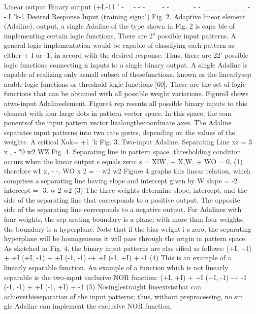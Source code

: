 \documentclass[11pt,a4paper,twocolumn]{article}
\begin{document}
Linear 
output 
Binary 
output 
(+L-11 
' - \_ - - - \_ \_ - - \_ \_ \_ - - \_ \_  
\_ \_ \_ \_ - - I  
'k-1
Desired Response Input 
(training signal) 
Fig. 2. Adaptive linear element (Adaline). 
output, a single Adaline of the type shown in Fig. 2 is capa
ble of implementing certain logic functions. There are 2" 
possible input patterns. A general logic implementation 
would be capable of classifying each pattern as either + I  
or -1, in accord with the desired response. Thus, there are 
22' possible logic functions connecting n inputs to a single 
binary output. A single Adaline is capable of realizing only 
asmall subset of thesefunctions, known as the linearlysep
arable logic functions or threshold logic functions [60]. 
These are the set of logic functions that can be obtained 
with all possible weight variations. 
Figure3 shows atwo-input Adalineelement. Figure4 rep
resents all possible binary inputs to this element with four 
large dots in pattern vector space. In this space, the com
ponentsof the input pattern vector liealongthecoordinate 
axes. The Adaline separates input patterns into two cate
gories, depending on the values of the weights. A critical 
Xok= +1 
'k 
Fig. 3. Two-input Adaline. 
Separating Line 
xz = 
3 x , -  "0 
w2 
WZ 
Fig. 4. Separating line in pattern space. 
thresholding condition occurs when the linear output s 
equals zero: 
s = XlW, + X,W, + WO = 0, 
(1) 
therefore 
w1 x, - -. 
WO 
x 2 =  -- 
w2 
w2 
Figure 4 graphs this linear relation, which comprises a 
separating line having slope and intercept given by 
W 
slope = -2 
intercept = -3. 
w 2  
w2 
(3) 
The three weights determine slope, intercept, and the side 
of the separating line that corresponds to a positive output. 
The opposite side of the separating line corresponds to a 
negative output. For Adalines with four weights, the sep
arating boundary is a plane; with more than four weights, 
the boundary is a hyperplane. Note that if the bias weight 
i s  zero, the separating hyperplane will be homogeneous
it will pass through the origin in pattern space. 
As sketched in Fig. 4, the binary input patterns are clas
sified as follows: 
(+I, +I) + +I 
(+I, -1) + +I 
(-1, -1) -+ +I 
(-1, +I) + -1 
(4) 
This is an example of a linearly separable function. An 
example of a function which is not linearly separable is the 
two-input exclusive NOR function: 
(+I, +I) + +I 
(+I, -1) 
-+ -1 
(-1, -1) + +I 
(-1, +I) + -1 
(5) 
Nosinglestraight lineexiststhat can achievethisseparation 
of the input patterns; thus, without preprocessing, no sin
gle Adaline can implement the exclusive NOR function. 
\end{document}
